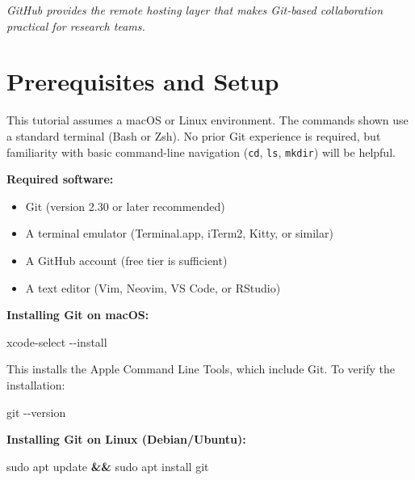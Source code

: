 \documentclass[
  letterpaper,
  DIV=11,
  numbers=noendperiod]{scrartcl}
\newenvironment{Shaded}{\begin{snugshade}}{\end{snugshade}}
\newcommand{\AttributeTok}[1]{\textcolor[rgb]{0.40,0.45,0.13}{#1}}
\newcommand{\ExtensionTok}[1]{\textcolor[rgb]{0.00,0.23,0.31}{#1}}
\newcommand{\FunctionTok}[1]{\textcolor[rgb]{0.28,0.35,0.67}{#1}}
\newcommand{\KeywordTok}[1]{\textcolor[rgb]{0.00,0.23,0.31}{\textbf{#1}}}
\newcommand{\NormalTok}[1]{\textcolor[rgb]{0.00,0.23,0.31}{#1}}
\providecommand{\tightlist}{%
  \setlength{\itemsep}{0pt}\setlength{\parskip}{0pt}}
\begin{document}
\emph{GitHub provides the remote hosting layer that makes Git-based
collaboration practical for research teams.}

\section{Prerequisites and Setup}\label{prerequisites-and-setup}

This tutorial assumes a macOS or Linux environment. The commands shown
use a standard terminal (Bash or Zsh). No prior Git experience is
required, but familiarity with basic command-line navigation
(\texttt{cd}, \texttt{ls}, \texttt{mkdir}) will be helpful.

\textbf{Required software:}

\begin{itemize}
\tightlist
\item
  Git (version 2.30 or later recommended)
\item
  A terminal emulator (Terminal.app, iTerm2, Kitty, or similar)
\item
  A GitHub account (free tier is sufficient)
\item
  A text editor (Vim, Neovim, VS Code, or RStudio)
\end{itemize}

\textbf{Installing Git on macOS:}

\begin{Shaded}
\begin{Highlighting}[]
\ExtensionTok{xcode{-}select} \AttributeTok{{-}{-}install}
\end{Highlighting}
\end{Shaded}

This installs the Apple Command Line Tools, which include Git. To verify
the installation:

\begin{Shaded}
\begin{Highlighting}[]
\FunctionTok{git} \AttributeTok{{-}{-}version}
\end{Highlighting}
\end{Shaded}

\textbf{Installing Git on Linux (Debian/Ubuntu):}

\begin{Shaded}
\begin{Highlighting}[]
\FunctionTok{sudo}\NormalTok{ apt update }\KeywordTok{\&\&} \FunctionTok{sudo}\NormalTok{ apt install git}
\end{Highlighting}
\end{Shaded}
\end{document}
